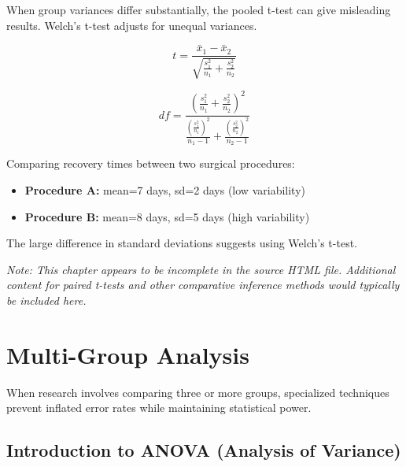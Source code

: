 \documentclass[
  11pt,
  letterpaper,
  oneside]{book}
\providecommand{\tightlist}{%
  \setlength{\itemsep}{0pt}\setlength{\parskip}{0pt}}\usepackage{longtable,booktabs,array}
\begin{document}
When group variances differ substantially, the pooled t-test can give
misleading results. Welch's t-test adjusts for unequal variances.

\[t = \frac{\bar{x}_1 - \bar{x}_2}{\sqrt{\frac{s_1^2}{n_1} + \frac{s_2^2}{n_2}}}\]

\[df = \frac{\left(\frac{s_1^2}{n_1} + \frac{s_2^2}{n_2}\right)^2}{\frac{\left(\frac{s_1^2}{n_1}\right)^2}{n_1-1} + \frac{\left(\frac{s_2^2}{n_2}\right)^2}{n_2-1}}\]

\begin{tcolorbox}[enhanced jigsaw, left=2mm, opacityback=0, titlerule=0mm, leftrule=.75mm, colbacktitle=quarto-callout-tip-color!10!white, title=\textcolor{quarto-callout-tip-color}{\faLightbulb}\hspace{0.5em}{When Variances Differ}, breakable, opacitybacktitle=0.6, rightrule=.15mm, colframe=quarto-callout-tip-color-frame, toprule=.15mm, bottomrule=.15mm, bottomtitle=1mm, toptitle=1mm, coltitle=black, arc=.35mm, colback=white]

Comparing recovery times between two surgical procedures:

\begin{itemize}
\tightlist
\item
  \textbf{Procedure A:} mean=7 days, sd=2 days (low variability)
\item
  \textbf{Procedure B:} mean=8 days, sd=5 days (high variability)
\end{itemize}

The large difference in standard deviations suggests using Welch's
t-test.

\end{tcolorbox}

\emph{Note: This chapter appears to be incomplete in the source HTML
file. Additional content for paired t-tests and other comparative
inference methods would typically be included here.}


\chapter{Multi-Group Analysis}\label{multi-group-analysis}

When research involves comparing three or more groups, specialized
techniques prevent inflated error rates while maintaining statistical
power.

\section{Introduction to ANOVA (Analysis of
Variance)}\label{introduction-to-anova-analysis-of-variance}
\end{document}
